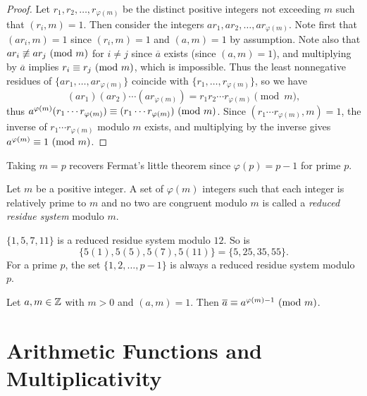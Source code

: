 \begin{proof}
  Let $r_1, r_2, \dots, r_{\varphi(m)}$
  be the distinct positive integers
  not exceeding $m$ such that
  $(r_i, m) = 1$. Then consider the
  integers $a r_1, a r_2, \dots, a r_{\varphi(m)}$.
  Note first that
  $(a r_i, m) = 1$ since
  $(r_i, m) = 1$ and $(a, m) = 1$
  by assumption. Note also that
  $a r_i \not\equiv a r_j \ (\mathrm{mod}\ m)$
  for $i \ne j$ since
  $\overline{a}$ exists (since
  $(a, m) = 1$), and multiplying
  by $\overline{a}$ implies
  $r_i \equiv r_j \ (\mathrm{mod}\ m)$, which is
  impossible. Thus the least
  nonnegative residues of
  $\{a r_1, \dots, a r_{\varphi(m)}\}$
  coincide with
  $\{r_1, \dots, r_{\varphi(m)}\}$, so
  we have
  \[
    (a r_1)(a r_2) \cdots (a r_{\varphi(m)})
    = r_1 r_2 \cdots r_{\varphi(m)} \pmod{m},
  \]
  thus $a^{\varphi(m)} (r_1 \cdots r_{\varphi(m)}) \equiv (r_1 \cdots r_{\varphi(m)}) \ (\mathrm{mod}\ m)$.
  Since $(r_1 \cdots r_{\varphi(m)}, m) = 1$,
  the inverse of $r_1 \cdots r_{\varphi(m)}$
  modulo $m$ exists, and
  multiplying by the inverse
  gives $a^{\varphi(m)} \equiv 1 \ (\mathrm{mod}\ m)$.
\end{proof}

\begin{remark}
  Taking $m = p$ recovers Fermat's little theorem
  since $\varphi(p) = p - 1$ for prime $p$.
\end{remark}

\begin{definition}
  Let $m$ be a positive integer.
  A set of $\varphi(m)$ integers
  such that each integer is relatively
  prime to $m$ and no two are
  congruent modulo $m$ is called
  a \emph{reduced residue system}
  modulo $m$.
\end{definition}

\begin{example}
  $\{1, 5, 7, 11\}$ is a reduced
  residue system modulo $12$.
  So is
  \[
    \{5(1), 5(5), 5(7), 5(11)\}
    = \{5, 25, 35, 55\}.
  \]
  For a prime $p$, the set
  $\{1, 2, \dots, p - 1\}$ is always a
  reduced residue system modulo $p$.
\end{example}

\begin{corollary}
  Let $a, m \in \mathbb{Z}$ with $m > 0$
  and $(a, m) = 1$. Then
  $\overline{a} \equiv a^{\varphi(m) - 1} \ (\mathrm{mod}\ m)$.
\end{corollary}

\section{Arithmetic Functions and Multiplicativity}


